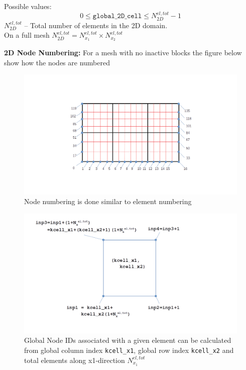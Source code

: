 \documentclass[a4paper,12pt]{article}
\begin{document}
\noindent Possible values:
\begin{equation*}
0 \le \texttt{global\_2D\_cell} \le N^{el,tot}_{2D}-1
\end{equation*}
$N^{el,tot}_{2D}$ -- Total number of elements in the 2D domain.\\ On a full mesh $N^{el,tot}_{2D} = N^{el,tot}_{x_1}\times N^{el,tot}_{x_2}$

\vspace*{1cm}

\noindent\textbf{2D Node Numbering:} For a mesh with no inactive blocks the figure below show how the nodes are numbered 

\begin{figure}[H]
	\centering
	\includegraphics[trim=180 50 200 100,clip,scale=0.35]{figures/FullMeshNodeNumbered.png}
	\caption{Node numbering is done similar to element numbering}
\end{figure}

\begin{figure}[H]
	\centering
	\includegraphics[scale=0.3]{figures/FullMeshNodeIDCalc.png}
	\caption{Global Node IDs associated with a given element can be calculated from global column index \texttt{kcell\_x1}, global row index \texttt{kcell\_x2} and total elements along x1-direction $N_{x_1}^{el,tot}$}			
\end{figure}
\end{document}

